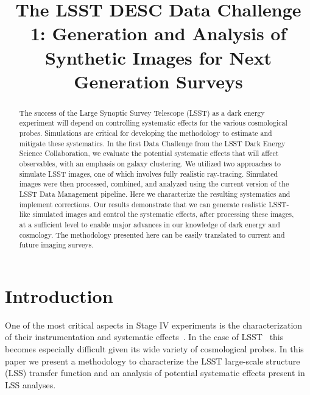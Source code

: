 \documentclass[\docopts]{\docclass}
\begin{document}
\title{ The LSST DESC Data Challenge 1: Generation and Analysis of Synthetic Images for Next Generation Surveys }

\maketitlepre

\begin{abstract}

The success of the Large Synoptic Survey Telescope (LSST) as a dark energy experiment will depend on controlling systematic effects for the various cosmological probes.  Simulations are critical for developing the methodology to estimate and mitigate these systematics.  In the first Data Challenge from the LSST Dark Energy Science Collaboration, we evaluate the potential systematic effects that will affect observables, with an emphasis on galaxy clustering.  We utilized two approaches to simulate LSST images, one of which involves fully realistic ray-tracing.  Simulated images were then processed, combined, and analyzed using the current version of the LSST Data Management pipeline.  Here we characterize the resulting systematics and implement corrections.  Our results demonstrate that we can generate realistic LSST-like simulated images and control the systematic effects, after processing these images, at a sufficient level to enable major advances in our knowledge of dark energy and cosmology. The methodology presented here can be easily translated to current and future imaging surveys.
\end{abstract}


\maketitlepost

%

\section{Introduction}
\label{sec:intro}

One of the most critical aspects in Stage IV experiments is the characterization of their instrumentation and systematic effects~\citep{2006astro.ph..9591A}. In the case of  LSST~\citep{Overview,ScienceBook,WhitePaper} this becomes especially difficult given its wide variety of cosmological probes. In this paper we present a methodology to characterize the LSST large-scale structure (LSS) transfer function and an analysis of potential systematic effects present in LSS analyses. 
\end{document}
